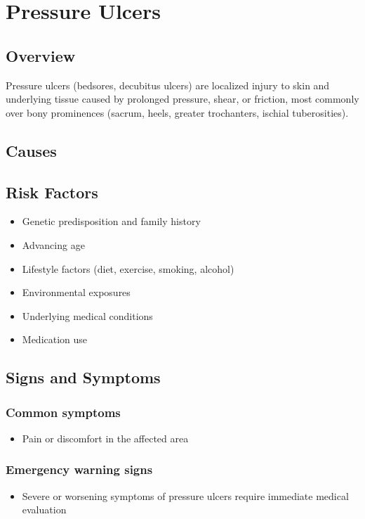 \chapter{Pressure Ulcers}
\label{sec:Pressure Ulcers}

\section{Overview}
Pressure ulcers (bedsores, decubitus ulcers) are localized injury to skin and underlying tissue caused by prolonged pressure, shear, or friction, most commonly over bony prominences (sacrum, heels, greater trochanters, ischial tuberosities).
\section{Causes}
\section{Risk Factors}

\begin{itemize}[noitemsep]
  \item Genetic predisposition and family history
  \item Advancing age
  \item Lifestyle factors (diet, exercise, smoking, alcohol)
  \item Environmental exposures
  \item Underlying medical conditions
  \item Medication use
\end{itemize}
\section{Signs and Symptoms}

\subsection{Common symptoms}
\begin{itemize}[noitemsep]
  \item Pain or discomfort in the affected area
  \end{itemize}

\subsection{Emergency warning signs}
\begin{itemize}[noitemsep]
  \item Severe or worsening symptoms of pressure ulcers require immediate medical evaluation
\end{itemize}
